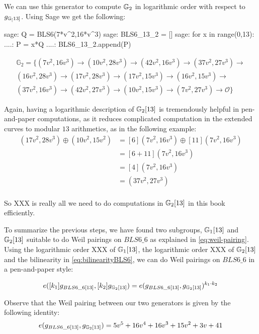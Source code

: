 We can use this generator to compute $\mathbb{G}_2$ in logarithmic order with respect to $g_{\mathbb{G}_[13]}$. Using Sage we get the following:
\begin{sagecommandline}
sage: Q = BLS6(7*v^2,16*v^3)
sage: BLS6_13_2 = []
sage: for x in range(0,13):
....:     P = x*Q
....:     BLS6_13_2.append(P)
\end{sagecommandline}
\begin{multline*}
\mathbb{G}_2=\{
(7v^2, 16v^3) \to
(10v^2, 28v^3)\to
(42v^2, 16v^3)\to
(37v^2, 27v^3)\to\\
(16v^2, 28v^3)\to
(17v^2, 28v^3)\to
(17v^2, 15v^3)\to
(16v^2, 15v^3)\to\\
(37v^2, 16v^3)\to
(42v^2, 27v^3)\to
(10v^2, 15v^3)\to
(7v^2, 27v^3)\to
\mathcal{O}\}
\end{multline*}

Again, having a logarithmic description of $\mathbb{G}_2[13]$ is tremendously helpful in pen-and-paper computations, as it reduces complicated computation in the extended curves to modular $13$ arithmetics, as in the following example:
\begin{align*}
(17v^2,28v^3)\oplus (10v^2,15v^2)  & = [6](7v^2,16v^3)\oplus [11](7v^2,16v^3)\\
                      & = [6+11](7v^2,16v^3)\\
                      & = [4](7v^2,16v^3)\\
                      & = (37v^2,27v^3)\\
\end{align*}

So XXX is really all we need to do computations in $\mathbb{G}_2[13]$ in this book efficiently. 

To summarize the previous steps, we have found two subgroups, $\mathbb{G}_1[13]$ and $\mathbb{G}_2[13]$ suitable to do Weil pairings on $BLS6\_6$ as explained in \ref{eq:weil-pairing}. Using the logarithmic order XXX of $\mathbb{G}_1[13]$, the logarithmic order XXX of $\mathbb{G}_2[13]$ and the bilinearity in \ref{eq:bilinearityBLS6}, we can do Weil pairings on $BLS6\_6$ in a pen-and-paper style:

\begin{equation}\label{eq:bilinearityBLS6}
e([k_1]g_{BLS6\_6[13]},[k_2]g_{\mathbb{G}_2[13]}) = 
e(g_{BLS6\_6[13]},g_{\mathbb{G}_2[13]})^{k_1\cdot k_2}
\end{equation}

Observe that the Weil pairing between our two generators is given by the following identity:
\begin{equation}\label{BLS6-weil-pairing}
e(g_{BLS6\_6[13]},g_{\mathbb{G}_2[13]})= 5v^5 + 16v^4 + 16v^3 + 15v^2 + 3v + 41
\end{equation}

